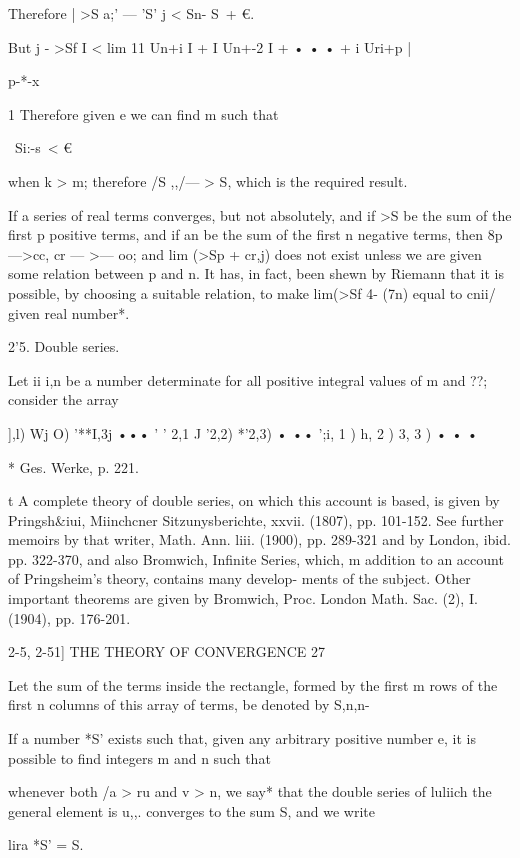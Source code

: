 Therefore | >S a;' — 'S' j < Sn- S\ + €.

But j - >Sf I < lim 11 Un+i I + I Un+-2 I + • • • + i Uri+p |

p-*-x

1 Therefore given e we can find m such that

\ Si:-s\ < €

when k > m; therefore /S ,,/— > S, which is the required result.

If a series of real terms converges, but not absolutely, and if >S be
the sum of the first p positive terms, and if an be the sum of the
first n negative terms, then 8p—>cc, cr — >— oo; and lim (>Sp + cr,j)
does not exist unless we are given some relation between p and n. It
has, in fact, been shewn by Riemann that it is possible, by choosing a
suitable relation, to make lim(>Sf 4- (7n) equal to cnii/ given real
number*.

2'5. Double series.

Let ii i,n be a number determinate for all positive integral values of
m and ??; consider the array

 ],l) Wj O) '**I,3j ••• ' ' 2,1 J '2,2) *'2,3) • •• ';i, 1 ) h, 2 ) 3,
3 ) • • •



* Ges. Werke, p. 221.

t A complete theory of double series, on which this account is based,
is given by Pringsh\&iui, Miinchcner Sitzunysberichte, xxvii. (1807),
pp. 101-152. See further memoirs by that writer, Math. Ann. liii.
(1900), pp. 289-321 and by London, ibid. pp. 322-370, and also
Bromwich, Infinite Series, which, m addition to an account of
Pringsheim's theory, contains many develop- ments of the subject.
Other important theorems are given by Bromwich, Proc. London Math.
Sac. (2), I. (1904), pp. 176-201.



2-5, 2-51] THE THEORY OF CONVERGENCE 27

Let the sum of the terms inside the rectangle, formed by the first m
rows of the first n columns of this array of terms, be denoted by
S,n,n-

If a number *S' exists such that, given any arbitrary positive number
e, it is possible to find integers m and n such that

whenever both /a > ru and v > n, we say* that the double series of
luliich the general element is u,,. converges to the sum S, and we
write

lira *S' = S.



